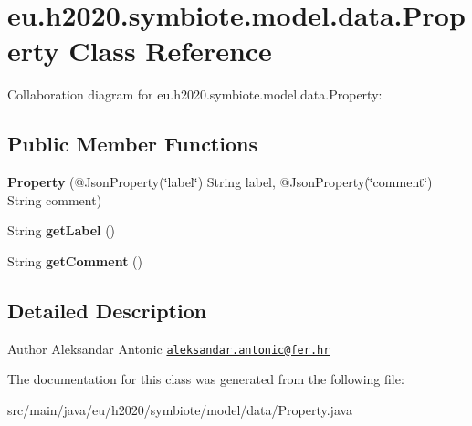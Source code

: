 \hypertarget{classeu_1_1h2020_1_1symbiote_1_1model_1_1data_1_1Property}{}\section{eu.\+h2020.\+symbiote.\+model.\+data.\+Property Class Reference}
\label{classeu_1_1h2020_1_1symbiote_1_1model_1_1data_1_1Property}


Collaboration diagram for eu.\+h2020.\+symbiote.\+model.\+data.\+Property\+:
\subsection*{Public Member Functions}
\begin{DoxyCompactItemize}
\item 
\mbox{\label{classeu_1_1h2020_1_1symbiote_1_1model_1_1data_1_1Property_a864a64e6d5cb9f27e22d68810783dd30}} 
{\bfseries Property} (@Json\+Property(\char`\"{}label\char`\"{}) String label, @Json\+Property(\char`\"{}comment\char`\"{}) String comment)
\item 
\mbox{\label{classeu_1_1h2020_1_1symbiote_1_1model_1_1data_1_1Property_a353841e24d52d132f3b60f836039924f}} 
String {\bfseries get\+Label} ()
\item 
\mbox{\label{classeu_1_1h2020_1_1symbiote_1_1model_1_1data_1_1Property_a64589a11b1f86ed77493928cc45f96ae}} 
String {\bfseries get\+Comment} ()
\end{DoxyCompactItemize}


\subsection{Detailed Description}
\begin{DoxyAuthor}{Author}
Aleksandar Antonic \href{mailto:aleksandar.antonic@fer.hr}{\tt aleksandar.\+antonic@fer.\+hr} 
\end{DoxyAuthor}


The documentation for this class was generated from the following file\+:\begin{DoxyCompactItemize}
\item 
src/main/java/eu/h2020/symbiote/model/data/Property.\+java\end{DoxyCompactItemize}
